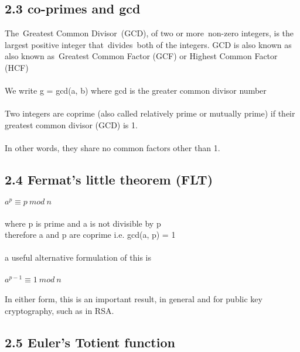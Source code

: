 \documentclass[11pt]{article}   	%
\begin{document}
\subsection*{2.3 co-primes and gcd}

The Greatest Common Divisor (GCD), of two or more non-zero integers, is the largest positive integer that divides both of the integers. GCD is also known as also known as Greatest Common Factor (GCF) or Highest Common Factor (HCF) \\
\\
We write g = gcd(a, b) where gcd is the greater common divisor number \\
\\
Two integers are coprime (also called relatively prime or mutually prime) if their greatest common divisor (GCD) is 1. \\
\\
In other words, they share no common factors other than 1.


\subsection*{2.4 Fermat’s little theorem (FLT)}

\boldmath $ a^p \equiv p \ mod \ n $ \unboldmath \\
\\
where p is prime and a is not divisible by p \\
therefore a and p are coprime i.e. gcd(a, p) = 1 \\
\\
a useful alternative formulation of this is \\
\\
$ a^{p-1} \equiv 1 \ mod \ n $ \\
\\
In either form, this is an important result, in general and for public key cryptography, such as in RSA.


\subsection*{2.5 Euler's Totient function}
\end{document}
